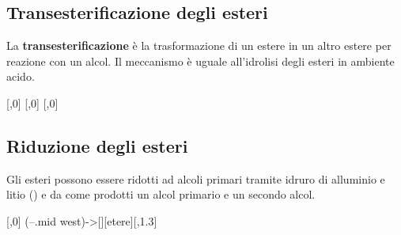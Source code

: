 \subsection{Transesterificazione degli esteri}
La \textbf{transesterificazione} è la trasformazione di un estere in un altro estere per reazione con un alcol. Il meccanismo è uguale all'idrolisi degli esteri in ambiente acido.

\begin{reaction}
[,0]
 [,0]\+ 
\arrow
{} [,0]\+ 
\end{reaction}


\subsection{Riduzione degli esteri}
Gli esteri possono essere ridotti ad alcoli primari tramite idruro di alluminio e litio () e da come prodotti un alcol primario e un secondo alcol.
\chemnameinit{}
\begin{reaction}
	[,0]
	 \arrow(--.mid west){->[][etere]}[,1.3]  \+ 
\end{reaction}
\chemnameinit{}